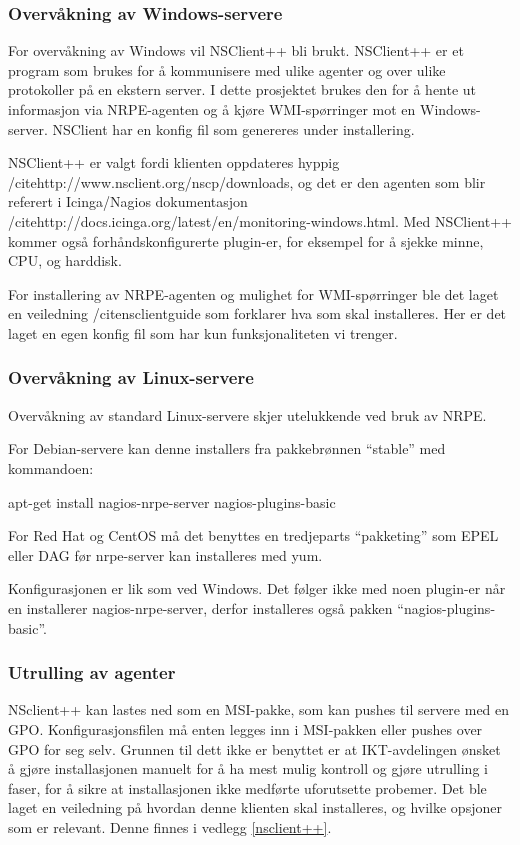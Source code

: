 \subsubsection{Overvåkning av Windows-servere}
For overvåkning av Windows vil NSClient++ bli brukt. NSClient++ er et program som brukes for  å kommunisere med ulike agenter og over ulike protokoller på en ekstern server. I dette prosjektet brukes den for å hente ut informasjon via NRPE-agenten og å kjøre WMI-spørringer mot en Windows-server. NSClient har en konfig fil som genereres under installering. 

NSClient++ er valgt fordi klienten oppdateres hyppig /cite{http://www.nsclient.org/nscp/downloads}, og det er den agenten som blir referert i Icinga/Nagios dokumentasjon /cite{http://docs.icinga.org/latest/en/monitoring-windows.html}. Med NSClient++ kommer også forhåndskonfigurerte plugin-er, for eksempel for å sjekke minne, CPU, og harddisk.

For installering av NRPE-agenten og mulighet for WMI-spørringer ble det laget en veiledning /cite{nsclientguide} som forklarer hva som skal installeres. Her er det laget en egen konfig fil som har kun funksjonaliteten vi trenger. 

\subsubsection{Overvåkning av Linux-servere}
Overvåkning av standard Linux-servere skjer utelukkende ved bruk av NRPE. 

For Debian-servere kan denne installers fra pakkebrønnen “stable” med kommandoen:

apt-get install nagios-nrpe-server nagios-plugins-basic

For Red Hat og CentOS må det benyttes en tredjeparts “pakketing” som EPEL eller DAG før nrpe-server kan installeres med yum.

Konfigurasjonen er lik som ved Windows. Det følger ikke med noen plugin-er når en installerer nagios-nrpe-server, derfor installeres også pakken “nagios-plugins-basic”.

\subsubsection{Utrulling av agenter}
NSclient++ kan lastes ned som en MSI-pakke, som kan pushes til servere med en GPO. Konfigurasjonsfilen må enten legges inn i MSI-pakken eller pushes over GPO for seg selv. Grunnen til dett ikke er benyttet er at IKT-avdelingen ønsket å gjøre installasjonen manuelt for å ha mest mulig kontroll og gjøre utrulling i faser, for å sikre at installasjonen ikke medførte uforutsette probemer. Det ble laget en veiledning på hvordan denne klienten skal installeres, og hvilke opsjoner som er relevant. Denne finnes i vedlegg \ref{nsclient++}.

